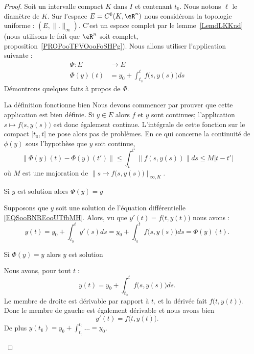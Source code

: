 \begin{proof}
    Soit un intervalle compact \( K\) dans \( I\) et contenant \( t_0\). Nous notons \( \ell\) le diamètre de \( K\). Sur l'espace \( E=C^0(K,\eR^n)\) nous considérons la topologie uniforme : \( (E,\| . \|_{\infty})\). C'est un espace complet par le lemme~\ref{LemdLKKnd} (nous utilisons le fait que \( \eR^n\) soit complet, proposition~\ref{PROPooTFVOooFoSHPg}). Nous allons utiliser l'application suivante :
    \begin{equation}        \label{EQooJUTBooILBKoE}
        \begin{aligned}
            \Phi\colon E&\to E \\
            \Phi(y)(t)&=y_0+\int_{t_0}^tf\big( s,y(s) \big)ds
        \end{aligned}
    \end{equation}
    Démontrons quelques faits à propos de \( \Phi\).
    \begin{subproof}
        \item[La définition fonctionne bien]
            Nous devons commencer par prouver que cette application est bien définie. Si \( y\in E\) alors \( f\) et \( y\) sont continues; l'application \( s\mapsto f\big(s,y(s)\big)\) est donc également continue. L'intégrale de cette fonction sur le compact \( \mathopen[ t_0 , t \mathclose]\) ne pose alors pas de problèmes. En ce qui concerne la continuité de \( \phi(y)\) sous l'hypothèse que \( y\) soit continue,
    \begin{equation}
        \| \Phi(y)(t)-\Phi(y)(t') \|\leq \int_t^{t'}\| f(s,y(s)) \|ds\leq M| t-t' |
    \end{equation}
    où \( M\) est une majoration de \( \| s\mapsto f\big( s,y(s) \big) \|_{\infty,K}\).

        \item[Si \( y\) est solution alors \( \Phi(y)=y\)]

            Supposons que \( y\) soit une solution de l'équation différentielle \eqref{EQSooBNREooUTfbMH}. Alors, vu que \( y'(t)=f\big( t,y(t) \big)\) nous avons :
            \begin{equation}
                y(t)=y_0+\int_{t_0}^ty'(s)ds=y_0+\int_{t_0}^tf\big( s,y(s) \big)ds=\Phi(y)(t).
            \end{equation}

        \item[Si \( \Phi(y)=y\) alors \( y\) est solution]

            Nous avons, pour tout \( t\) :
            \begin{equation}
                y(t)=y_0+\int_{t_0}^tf\big( s,y(s) \big)ds.
            \end{equation}
            Le membre de droite est dérivable par rapport à \( t\), et la dérivée fait \(  f\big( t,y(t) \big)   \). Donc le membre de gauche est également dérivable et nous avons bien
            \begin{equation}
                y'(t)=f\big( t,y(t) \big).
            \end{equation}
            De plus \( y(t_0)=y_0+\int_{t_0}^{t_0}\ldots=y_0\).
    \end{subproof}


\end{proof}
